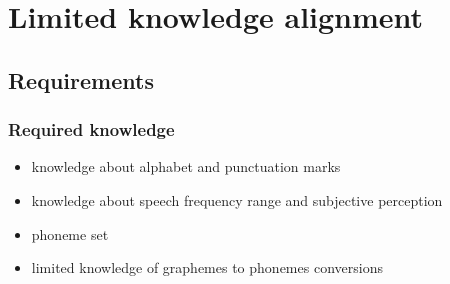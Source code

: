 \documentclass[]{beamer}
\begin{document}
\section{Limited knowledge alignment}
\subsection{Requirements}
\begin{frame}
    \frametitle{Required knowledge}
    \begin{itemize}
        \item knowledge about alphabet and punctuation marks
        \item knowledge about speech frequency range and subjective perception
        \item phoneme set \footnotemark[1]
        \item limited knowledge of graphemes to phonemes conversions \footnotemark[1]
    \end{itemize}
\end{frame}
\end{document}
